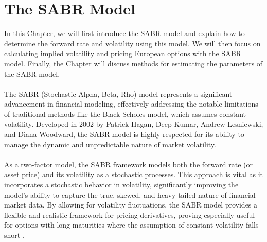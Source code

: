 \section{ The SABR Model} \label{SABR_model}
In this Chapter, we will first introduce the SABR model
 and explain how to determine the forward rate and 
 volatility using this model. We will then focus on 
 calculating implied volatility and pricing European 
 options with the SABR model. Finally, the Chapter 
 will discuss methods for estimating the parameters 
 of the SABR model.
\\\\
The SABR (Stochastic Alpha, Beta, Rho) 
model represents a significant advancement in financial modeling, 
effectively addressing the notable limitations of traditional methods
like the Black-Scholes model, which assumes 
constant volatility. Developed in 2002 by Patrick Hagan, Deep Kumar, 
Andrew Lesniewski, and Diana Woodward, the SABR model is highly respected for 
its ability to manage the dynamic and unpredictable nature of market 
volatility.
\\\\
As a two-factor model, the SABR framework models both the forward rate 
(or asset price) and its volatility as a stochastic processes. This approach 
is vital as it incorporates a stochastic behavior in volatility, significantly 
improving the model's ability to capture the true, skewed, and heavy-tailed 
nature of financial market data. By allowing for volatility fluctuations, 
the SABR model provides a flexible and realistic framework for pricing 
derivatives, proving especially useful for options with long maturities where 
the assumption of constant volatility falls short \cite{Smile}.

